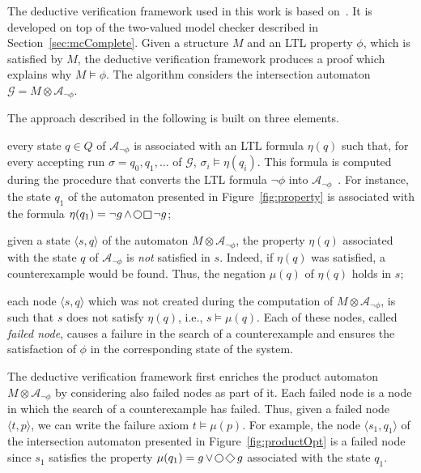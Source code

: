 The deductive verification framework used in this work is based on~\cite{peled2001model}.
It is developed on top of the two-valued model checker described in Section~\ref{sec:mcComplete}.
Given a structure $M$ and an LTL property $\phi$, which is satisfied by $M$, the deductive verification framework produces a proof which explains why $M \models \phi$.
The algorithm considers the intersection automaton $\mathcal{G}=M\otimes\mathcal{A}_{\lnot\phi}$.

The approach described in the following is built on three elements.
\begin{enumerate*}
\item every state $q\in Q$ of $\mathcal{A}_{\lnot\phi}$ is associated with an LTL formula $\eta(q)$ such that, for every accepting run $\sigma=q_0,q_1,...$ of $\mathcal{G}$, $\sigma_i\models\eta(q_i)$. This formula is computed during the procedure that converts the LTL formula $\neg \phi$ into $\mathcal{A}_{\lnot\phi}$~\cite{gerth1996ltl2ba}. For instance, the state $q_1$ of the automaton presented in Figure~\ref{fig:property} is associated with the formula $\eta(q_1)= \lnot g \LTLand \LTLnext \LTLglobally \lnot g$;
\item given a state $\langle s, q \rangle$ of the automaton $M\otimes\mathcal{A}_{\lnot\phi}$, the property $\eta(q)$ associated with the state $q$ of $\mathcal{A}_{\lnot\phi}$ is \emph{not} satisfied in $s$. 
Indeed, if $\eta(q)$ was satisfied, a counterexample would be found.
Thus, the negation $\mu(q)$ of $\eta(q)$ holds in $s$;
\item each node $\langle s, q \rangle$  which was not created during the computation of $M\otimes\mathcal{A}_{\lnot\phi}$, is such that $s$ does not satisfy $\eta(q)$, i.e., $s \models \mu(q)$.
Each of these nodes, called \emph{failed node}, causes a failure in the search of a counterexample and ensures the satisfaction of $\phi$ in the corresponding state of the system.
\end{enumerate*}

The deductive verification framework first enriches the product automaton $M\otimes\mathcal{A}_{\lnot\phi}$ by considering also failed nodes as part of it.
Each failed node is a node in which the search of a counterexample has failed. 
Thus,  given a failed node $\langle t,p \rangle$,  we can write the failure axiom $t\models \mu(p)$.
For example, the node $\langle s_1, q_1 \rangle$ of the intersection automaton presented in Figure~\ref{fig:productOpt} is a failed node since $s_1$ satisfies the property $\mu(q_1)= g \LTLor \LTLnext \LTLfinally g$ associated with the state $q_1$.

